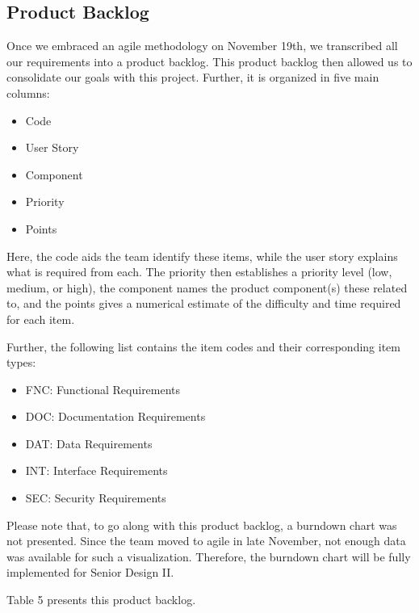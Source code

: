 \documentclass[titlepage, 12pt]{article}
\begin{document}
\subsection{Product Backlog}

Once we embraced an agile methodology on November 19th, we transcribed all our requirements into a product backlog. This product backlog then allowed us to consolidate our goals with this project. Further, it is organized in five main columns:

\begin{itemize}
    \item Code
    \item User Story
    \item Component
    \item Priority
    \item Points
\end{itemize}

Here, the code aids the team identify these items, while the user story explains what is required from each. The priority then establishes a priority level (low, medium, or high), the component names the product component(s) these related to, and the points gives a numerical estimate of the difficulty and time required for each item.

Further, the following list contains the item codes and their corresponding item types:

\begin{itemize}
    \item FNC: Functional Requirements
    \item DOC: Documentation Requirements
    \item DAT: Data Requirements
    \item INT: Interface Requirements
    \item SEC: Security Requirements
\end{itemize}

Please note that, to go along with this product backlog, a burndown chart was not presented. Since the team moved to agile in late November, not enough data was available for such a visualization. Therefore, the burndown chart will be fully implemented for Senior Design II.

Table 5 presents this product backlog.
\end{document}
